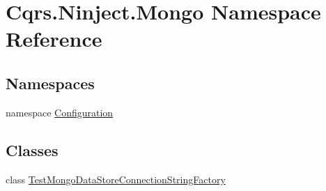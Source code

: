 \hypertarget{namespaceCqrs_1_1Ninject_1_1Mongo}{}\section{Cqrs.\+Ninject.\+Mongo Namespace Reference}
\label{namespaceCqrs_1_1Ninject_1_1Mongo}
\subsection*{Namespaces}
\begin{DoxyCompactItemize}
\item 
namespace \hyperlink{namespaceCqrs_1_1Ninject_1_1Mongo_1_1Configuration}{Configuration}
\end{DoxyCompactItemize}
\subsection*{Classes}
\begin{DoxyCompactItemize}
\item 
class \hyperlink{classCqrs_1_1Ninject_1_1Mongo_1_1TestMongoDataStoreConnectionStringFactory}{Test\+Mongo\+Data\+Store\+Connection\+String\+Factory}
\end{DoxyCompactItemize}
